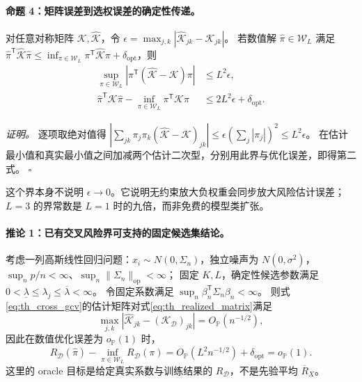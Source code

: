 \documentclass[UTF8,fontset=fandol,11pt,a4paper]{ctexart}
\begin{document}
\paragraph{命题 4：矩阵误差到选权误差的确定性传递。}
对任意对称矩阵 $\mathcal K,\widehat{\mathcal K}$，令
$\epsilon=\max_{j,k}|\widehat{\mathcal K}_{jk}-\mathcal K_{jk}|$。
若数值解 $\widehat\pi\in\mathcal W_L$ 满足
$\widehat\pi^{\mathsf T}\widehat{\mathcal K}\widehat\pi
\le\inf_{\pi\in\mathcal W_L}\pi^{\mathsf T}\widehat{\mathcal K}\pi+\delta_{\mathrm{opt}}$，则
\begin{align}
 \sup_{\pi\in\mathcal W_L}
 |\pi^{\mathsf T}(\widehat{\mathcal K}-\mathcal K)\pi|
 &\le L^2\epsilon,\label{eq:th_uniform_bound}\\
 \widehat\pi^{\mathsf T}\mathcal K\widehat\pi
 -\inf_{\pi\in\mathcal W_L}\pi^{\mathsf T}\mathcal K\pi
 &\le 2L^2\epsilon+\delta_{\mathrm{opt}}.
 \label{eq:th_oracle_bound}
\end{align}

\textit{证明。}
逐项取绝对值得
$|\sum_{jk}\pi_j\pi_k(\widehat{\mathcal K}-\mathcal K)_{jk}|
\le\epsilon(\sum_j|\pi_j|)^2\le L^2\epsilon$。
在估计最小值和真实最小值之间加减两个估计二次型，分别用此界与优化误差，即得第二式。
\hfill$\square$

这个界本身不说明 $\epsilon\to0$。它说明无约束放大负权重会同步放大风险估计误差；
$L=3$ 的界常数是 $L=1$ 时的九倍，而非免费的模型类扩张。

\paragraph{推论 1：已有交叉风险界可支持的固定候选集结论。}
考虑一列高斯线性回归问题：$x_i\sim N(0,\Sigma_n)$，独立噪声为 $N(0,\sigma^2)$，
$\sup_n p/n<\infty$、$\sup_n\lVert\Sigma_n\rVert_{\mathrm{op}}<\infty$；
固定 $K,L$，确定性候选参数满足
$0<\underline\lambda\le\lambda_j\le\overline\lambda<\infty$。
令固定系数满足 $\sup_n\beta_n^{\mathsf T}\Sigma_n\beta_n<\infty$。
则式\eqref{eq:th_cross_gcv}的估计矩阵对式\eqref{eq:th_realized_matrix}满足
\begin{equation}\label{eq:th_cross_rate}
 \max_{j,k}|\widehat{\mathcal K}_{jk}-(\mathcal K_{\mathcal D})_{jk}|
 =O_{\mathbb P}(n^{-1/2}),
\end{equation}
因此在数值优化误差为 $o_{\mathbb P}(1)$ 时，
\begin{equation}\label{eq:th_cross_consistency}
 R_{\mathcal D}(\widehat\pi)-\inf_{\pi\in\mathcal W_L}R_{\mathcal D}(\pi)
 =O_{\mathbb P}(L^2n^{-1/2})+\delta_{\mathrm{opt}}=o_{\mathbb P}(1).
\end{equation}
这里的 oracle 目标是给定真实系数与训练结果的 $R_{\mathcal D}$，不是先验平均 $\overline R_X$。
\end{document}
